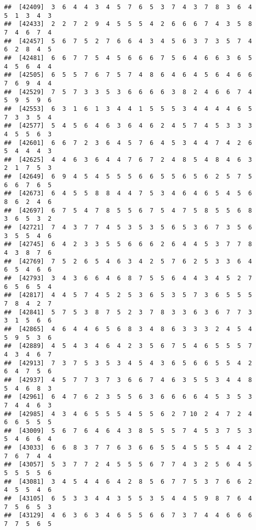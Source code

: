 \documentclass[
]{book}
\begin{document}
\begin{verbatim}
##  [42409]  3  6  4  4  3  4  5  7  6  5  3  7  4  3  7  8  3  6  4  5  1  3  4  3
##  [42433]  2  2  7  2  9  4  5  5  5  4  2  6  6  6  7  4  3  5  8  7  4  6  7  4
##  [42457]  5  6  7  5  2  7  6  6  4  3  4  5  6  3  7  3  5  7  4  6  2  8  4  5
##  [42481]  6  6  7  7  5  4  5  6  6  6  7  5  6  4  6  6  3  6  5  4  5  6  4  4
##  [42505]  6  5  5  7  6  7  5  7  4  8  6  4  6  4  5  6  4  6  6  7  6  9  4  4
##  [42529]  7  5  7  3  3  5  3  6  6  6  6  3  8  2  4  6  6  7  4  5  9  5  9  6
##  [42553]  6  3  1  6  1  3  4  4  1  5  5  5  3  4  4  4  4  6  5  7  3  3  5  4
##  [42577]  5  4  5  6  4  6  3  6  4  6  2  4  5  7  4  5  3  3  3  4  5  5  6  3
##  [42601]  6  6  7  2  3  6  4  5  7  6  4  5  3  4  4  7  4  2  6  5  4  4  4  3
##  [42625]  4  4  6  3  6  4  4  7  6  7  2  4  8  5  4  8  4  6  3  2  1  7  5  3
##  [42649]  6  9  4  5  4  5  5  5  6  6  5  5  6  5  6  2  5  7  5  6  6  7  6  5
##  [42673]  6  4  5  5  8  8  4  4  7  5  3  4  6  4  6  5  4  5  6  8  6  2  4  6
##  [42697]  6  7  5  4  7  8  5  5  6  7  5  4  7  5  8  5  5  6  8  3  6  5  3  2
##  [42721]  7  4  3  7  7  4  5  3  5  3  5  6  5  3  6  7  3  5  6  3  5  5  4  6
##  [42745]  6  4  2  3  3  5  5  6  6  6  2  6  4  4  5  3  7  7  8  4  3  8  7  6
##  [42769]  7  5  2  6  5  4  6  3  4  2  5  7  6  2  5  3  3  6  4  6  5  4  6  6
##  [42793]  3  4  3  6  6  4  6  8  7  5  5  6  4  4  3  4  5  2  7  6  5  6  5  4
##  [42817]  4  4  5  7  4  5  2  5  3  6  5  3  5  7  3  6  5  5  5  7  8  4  2  7
##  [42841]  5  7  5  3  8  7  5  2  3  7  8  3  3  6  3  6  7  7  3  3  1  5  6  6
##  [42865]  4  6  4  4  6  5  6  8  3  4  8  6  3  3  3  2  4  5  4  5  9  5  3  6
##  [42889]  4  5  4  3  4  6  4  2  3  5  6  7  5  4  6  5  5  5  7  4  3  4  6  7
##  [42913]  7  3  7  5  3  5  3  4  5  4  3  6  5  6  6  5  5  4  2  6  4  7  5  6
##  [42937]  4  5  7  7  3  7  3  6  6  7  4  6  3  5  5  3  4  4  8  5  4  6  8  3
##  [42961]  6  4  7  6  2  3  5  5  6  3  6  6  6  6  4  5  3  5  3  7  4  4  6  3
##  [42985]  4  3  4  6  5  5  5  4  5  5  6  2  7 10  2  4  7  2  4  6  6  5  5  5
##  [43009]  5  6  7  6  4  6  4  3  8  5  5  5  7  4  5  3  7  5  3  5  4  6  6  4
##  [43033]  6  6  8  3  7  7  6  3  6  6  5  5  4  5  5  5  4  4  2  7  6  7  4  4
##  [43057]  5  3  7  7  2  4  5  5  5  6  7  7  4  3  2  5  6  4  5  5  5  5  5  6
##  [43081]  3  4  5  4  4  6  4  2  8  5  6  7  7  5  3  7  6  6  2  4  5  5  4  6
##  [43105]  6  5  3  3  4  4  3  5  5  3  5  4  4  5  9  8  7  6  4  7  5  6  5  3
##  [43129]  4  6  3  6  3  4  6  5  5  6  6  7  3  7  4  4  6  6  6  7  7  5  6  5

\end{verbatim}
\end{document}
